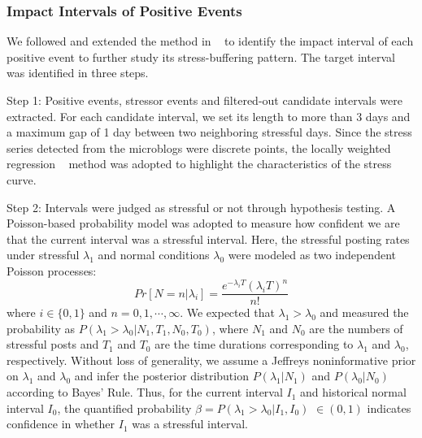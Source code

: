\documentclass[5p,times,numbers,authoryear]{elsarticle}
\begin{document}
\subsubsection{Impact Intervals of Positive Events}
\label{subsec:interval}
We followed and extended the method in ~\citep{Li2017Analyzing} to identify the impact interval of each positive event to further study its stress-buffering pattern.
The target interval was identified in three steps.

Step 1:
Positive events, stressor events and filtered-out candidate intervals were extracted.
For each candidate interval, we set its length to more than 3 days and a maximum gap of 1 day between two neighboring stressful days.
Since the stress series detected from the microblogs were discrete points, the locally weighted regression ~\citep{Cleveland1988Locally} method was adopted to highlight the characteristics of the stress curve.

Step 2:
Intervals were judged as stressful or not through hypothesis testing.
A Poisson-based probability model was adopted to measure how confident we are that the current interval was a stressful interval.
Here, the stressful posting rates under stressful $\lambda_1$ and normal conditions $\lambda_0$ were modeled as two independent Poisson processes:
\begin{equation}
Pr[N=n|\lambda_i]=\frac{e^{-\lambda_i T}{(\lambda_i T)}^n}{n!}
\end{equation}
where $i\in\{0,1\}$ and $n=0,1,\cdots,\infty$.
We expected that $\lambda_1 > \lambda_0$ and measured the probability as $P(\lambda_1>\lambda_0|N_1, T_1, N_0, T_0)$,
where $N_1$ and $N_0$ are the numbers of stressful posts and $T_1$ and $T_0$ are the time durations corresponding to $\lambda_1$ and $\lambda_0$, respectively.
Without loss of generality, we assume a Jeffreys noninformative prior on $\lambda_1$ and $\lambda_0$ and infer the posterior distribution $P(\lambda_1|N_1)$ and $P(\lambda_0|N_0)$ according to Bayes' Rule.
Thus, for the current interval $I_1$ and historical normal interval $I_0$, the quantified probability $\beta = P(\lambda_1>\lambda_0|I_1,I_0)$ $\in (0,1)$ indicates confidence in
whether $I_1$ was a stressful interval.
\end{document}
